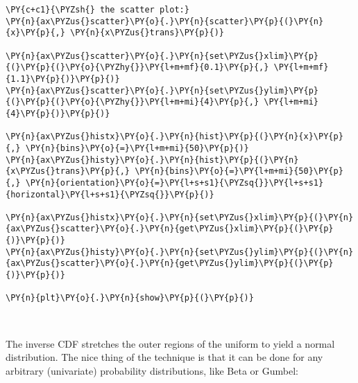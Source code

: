 \begin{tcolorbox}[breakable, size=fbox, boxrule=1pt, pad at break*=1mm,colback=cellbackground, colframe=cellborder]
\begin{Verbatim}[commandchars=\\\{\}]
\PY{c+c1}{\PYZsh{} the scatter plot:}
\PY{n}{ax\PYZus{}scatter}\PY{o}{.}\PY{n}{scatter}\PY{p}{(}\PY{n}{x}\PY{p}{,} \PY{n}{x\PYZus{}trans}\PY{p}{)}

\PY{n}{ax\PYZus{}scatter}\PY{o}{.}\PY{n}{set\PYZus{}xlim}\PY{p}{(}\PY{p}{(}\PY{o}{\PYZhy{}}\PY{l+m+mf}{0.1}\PY{p}{,} \PY{l+m+mf}{1.1}\PY{p}{)}\PY{p}{)}
\PY{n}{ax\PYZus{}scatter}\PY{o}{.}\PY{n}{set\PYZus{}ylim}\PY{p}{(}\PY{p}{(}\PY{o}{\PYZhy{}}\PY{l+m+mi}{4}\PY{p}{,} \PY{l+m+mi}{4}\PY{p}{)}\PY{p}{)}

\PY{n}{ax\PYZus{}histx}\PY{o}{.}\PY{n}{hist}\PY{p}{(}\PY{n}{x}\PY{p}{,} \PY{n}{bins}\PY{o}{=}\PY{l+m+mi}{50}\PY{p}{)}
\PY{n}{ax\PYZus{}histy}\PY{o}{.}\PY{n}{hist}\PY{p}{(}\PY{n}{x\PYZus{}trans}\PY{p}{,} \PY{n}{bins}\PY{o}{=}\PY{l+m+mi}{50}\PY{p}{,} \PY{n}{orientation}\PY{o}{=}\PY{l+s+s1}{\PYZsq{}}\PY{l+s+s1}{horizontal}\PY{l+s+s1}{\PYZsq{}}\PY{p}{)}

\PY{n}{ax\PYZus{}histx}\PY{o}{.}\PY{n}{set\PYZus{}xlim}\PY{p}{(}\PY{n}{ax\PYZus{}scatter}\PY{o}{.}\PY{n}{get\PYZus{}xlim}\PY{p}{(}\PY{p}{)}\PY{p}{)}
\PY{n}{ax\PYZus{}histy}\PY{o}{.}\PY{n}{set\PYZus{}ylim}\PY{p}{(}\PY{n}{ax\PYZus{}scatter}\PY{o}{.}\PY{n}{get\PYZus{}ylim}\PY{p}{(}\PY{p}{)}\PY{p}{)}

\PY{n}{plt}\PY{o}{.}\PY{n}{show}\PY{p}{(}\PY{p}{)}
\end{Verbatim}
\end{tcolorbox}

    \begin{center}
    \end{center}
    { \hspace*{\fill} \\}
    
    The inverse CDF stretches the outer regions of the uniform to yield a
normal distribution. The nice thing of the technique is that it can be
done for any arbitrary (univariate) probability distributions, like Beta
or Gumbel:

